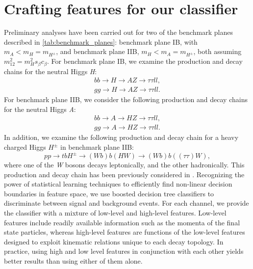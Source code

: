 {\section{Crafting features for our classifier}\label{sec:analysis_details}
Preliminary analyses have been carried out for two of the benchmark planes described in \autoref{tab:benchmark_planes}: benchmark plane IB, with $m_A < m_H = m_{H^\pm}$, and benchmark plane IIB, $m_H < m_A = m_{H^\pm}$, both assuming $m_{12}^2 = m_H^2s_\beta c_\beta$. For benchmark plane IB, we examine the production and decay chains for the neutral Higgs \emph{H}:
\begin{align*}
  bb\rightarrow H\rightarrow AZ\rightarrow \tau\tau ll,\\
  gg\rightarrow H\rightarrow AZ\rightarrow \tau\tau ll.
\end{align*}
For benchmark plane IIB, we consider the following production and decay chains for the neutral Higgs \emph{A}:
\begin{align*}
  bb\rightarrow A\rightarrow HZ\rightarrow \tau\tau ll,\\
  gg\rightarrow A\rightarrow HZ\rightarrow \tau\tau ll.
\end{align*}
In addition, we examine the following production and decay chain for a heavy charged Higgs $H^\pm$ in benchmark plane IIB:
\[pp\rightarrow tbH^\pm\rightarrow (Wb)b(HW)\rightarrow (Wb)b((\tau\tau)W),\]
where one of the \emph{W} bosons decays leptonically, and the other hadronically. This production and decay chain has been previously considered in \cite{Coleppa2014a}.
Recognizing the power of statistical learning techniques to efficiently find non-linear decision boundaries in feature space, we use boosted decision tree classifiers to discriminate between signal and background events. For each channel, we provide the classifier with a mixture of low-level and high-level features. Low-level features include readily available information such as the momenta of the final state particles, whereas high-level features are functions of the low-level features designed to exploit kinematic relations unique to each decay topology. In practice, using high and low level features in conjunction with each other yields better results than using either of them alone.

}
